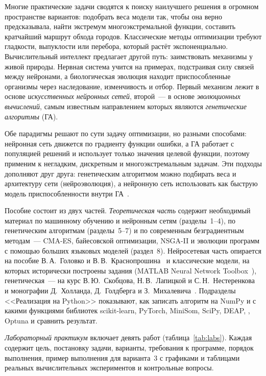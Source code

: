 
Многие практические задачи сводятся к поиску наилучшего решения в огромном пространстве вариантов:
подобрать веса модели так, чтобы она верно предсказывала, найти экстремум многоэкстремальной
функции, составить кратчайший маршрут обхода городов. Классические методы оптимизации требуют
гладкости, выпуклости или перебора, который растёт экспоненциально. Вычислительный интеллект
предлагает другой путь: заимствовать механизмы у живой природы. Нервная система учится на примерах,
подстраивая силу связей между нейронами, а биологическая эволюция находит приспособленные организмы
через наследование, изменчивость и отбор. Первый механизм лежит в основе \emph{искусственных нейронных
сетей}, второй~--- в основе \emph{эволюционных вычислений}, самым известным направлением которых являются
\emph{генетические алгоритмы} (ГА).

Обе парадигмы решают по сути задачу оптимизации, но разными способами: нейронная сеть движется по
градиенту функции ошибки, а ГА работает с популяцией решений и использует только значения целевой
функции, поэтому применим к негладким, дискретным и многоэкстремальным задачам. Эти подходы дополняют друг друга: генетическим алгоритмом можно подбирать
веса и архитектуру сети (нейроэволюция), а нейронную сеть использовать как быструю модель
приспособленности внутри ГА~\cite{rutkovskaya2006}.

Пособие состоит из двух частей. \emph{Теоретическая часть} содержит необходимый материал по машинному
обучению и нейронным сетям (разделы~1--4), по генетическим алгоритмам (разделы~5--7) и по современным
безградиентным методам~--- CMA-ES, байесовской оптимизации, NSGA-II и эволюции программ с помощью больших
языковых моделей (раздел~8). Нейросетевая
часть опирается на пособие В.\,А.~Головко и В.\,В.~Краснопрошина~\cite{golovko2017} и классические модели,
на которых исторически построены задания (MATLAB Neural Network Toolbox~\cite{medvedev2002}),
генетическая~--- на курс В.\,Ю.~Скобцова, Н.\,В.~Лапицкой и С.\,Н.~Нестеренкова~\cite{skobtsov2018} и
монографии Д.~Холланда, Д.~Голдберга и З.~Михалевича~\cite{holland1975, goldberg1989, michalewicz1996}.
Подразделы <<Реализация на Python>> показывают, как записать алгоритм на NumPy и с какими функциями
библиотек scikit-learn, PyTorch, MiniSom, SciPy, DEAP, , Optuna и  сравнить результат.

\emph{Лабораторный практикум} включает девять работ (таблица~\ref{tab:labs}). Каждая содержит цель,
постановку задачи, варианты, требования к программе, порядок выполнения, пример выполнения для
варианта~3 с графиками и таблицами реальных вычислительных экспериментов и контрольные вопросы.

